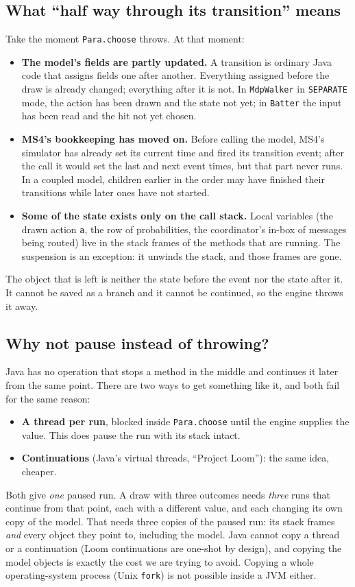 \documentclass[11pt]{article}
\newcommand{\code}[1]{\texttt{#1}}
\begin{document}
\subsection{What ``half way through its transition'' means}
Take the moment \code{Para.choose} throws. At that moment:
\begin{itemize}
\item \textbf{The model's fields are partly updated.} A transition is ordinary Java code that assigns fields one
  after another. Everything assigned before the draw is already changed; everything after it is not. In
  \code{MdpWalker} in \code{SEPARATE} mode, the action has been drawn and the state not yet; in \code{Batter} the
  input has been read and the hit not yet chosen.
\item \textbf{MS4's bookkeeping has moved on.} Before calling the model, MS4's simulator has already set its current
  time and fired its transition event; after the call it would set the last and next event times, but that part never
  runs. In a coupled model, children earlier in the order may have finished their transitions while later ones have
  not started.
\item \textbf{Some of the state exists only on the call stack.} Local variables (the drawn action \code{a}, the row of
  probabilities, the coordinator's in-box of messages being routed) live in the stack frames of the methods that are
  running. The suspension is an exception: it unwinds the stack, and those frames are gone.
\end{itemize}
The object that is left is neither the state before the event nor the state after it. It cannot be saved as a branch
and it cannot be continued, so the engine throws it away.

\subsection{Why not pause instead of throwing?}
Java has no operation that stops a method in the middle and continues it later from the same point. There are two ways
to get something like it, and both fail for the same reason:
\begin{itemize}
\item \textbf{A thread per run}, blocked inside \code{Para.choose} until the engine supplies the value. This does pause
  the run with its stack intact.
\item \textbf{Continuations} (Java's virtual threads, ``Project Loom''): the same idea, cheaper.
\end{itemize}
Both give \emph{one} paused run. A draw with three outcomes needs \emph{three} runs that continue from that point, each
with a different value, and each changing its own copy of the model. That needs three copies of the paused run:
its stack frames \emph{and} every object they point to, including the model. Java cannot copy a thread or a
continuation (Loom continuations are one-shot by design), and copying the model objects is exactly the cost we are
trying to avoid. Copying a whole operating-system process (Unix \code{fork}) is not possible inside a JVM either.
\end{document}
